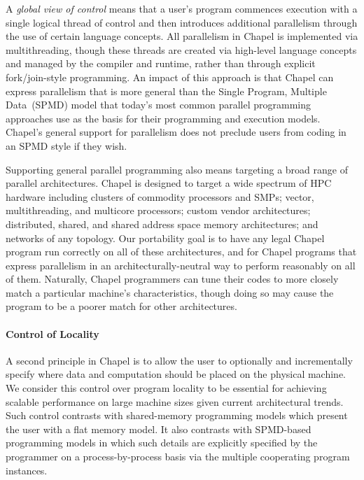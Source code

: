 A \emph{global view of control} means that a user's program commences
execution with a single logical thread of control and then introduces
additional parallelism through the use of certain language concepts.
All parallelism in Chapel is implemented via multithreading, though
these threads are created via high-level language concepts and managed
by the compiler and runtime, rather than through explicit
fork/join-style programming.  An impact of this approach is that
Chapel can express parallelism that is more general than the Single
Program, Multiple Data~(SPMD) model that today's most common parallel
programming approaches use as the basis for their programming and
execution models.
Chapel's general support for parallelism does not preclude users
from coding in an SPMD style if they wish.


Supporting general parallel programming also means targeting a broad
range of parallel architectures.  Chapel is designed to target a wide
spectrum of HPC hardware including clusters of commodity processors
and SMPs; vector, multithreading, and multicore processors; custom
vendor architectures; distributed, shared, and shared address space
memory architectures; and networks of any topology.  Our portability
goal is to have any legal Chapel program run correctly on all of these
architectures, and for Chapel programs that express parallelism in an
architecturally-neutral way to perform reasonably on all of them.
Naturally, Chapel programmers can tune their codes to more closely
match a particular machine's characteristics, though doing so may
cause the program to be a poorer match for other architectures.  

\paragraph{Control of Locality}

A second principle in Chapel is to allow the user to optionally and
incrementally specify where data and computation should be placed on
the physical machine.  We consider this control over program locality
to be essential for achieving scalable performance on large machine
sizes given current architectural trends.  Such control contrasts with
shared-memory programming models which present the user with a flat
memory model.  It also contrasts with SPMD-based programming models in
which such details are explicitly specified by the programmer on a
process-by-process basis via the multiple cooperating program
instances.

